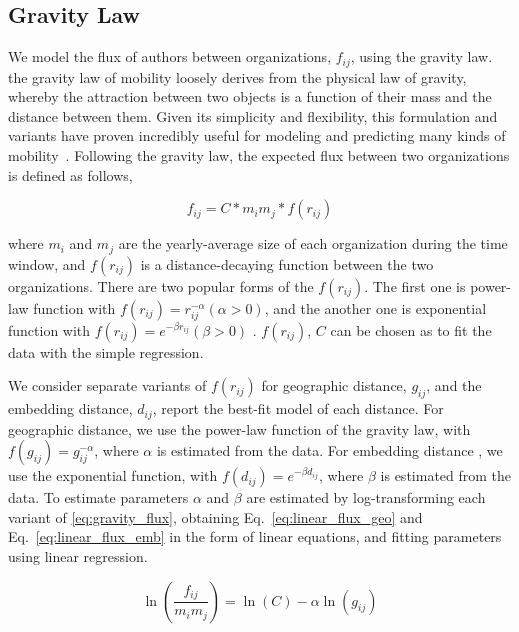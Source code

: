 \documentclass[12pt]{article} %
\begin{document}
%
%
\subsection{Gravity Law}

We model the flux of authors between organizations, $f_{ij}$, using the gravity law. 
the gravity law of mobility loosely derives from the physical law of gravity, whereby the attraction between two objects is a function of their mass and the distance between them.
Given its simplicity and flexibility, this formulation and variants have proven incredibly useful for modeling and predicting many kinds of mobility~\autocite{jung2008highwaygravity, curiel2018citygravity, lewer2008immigrationgravity, xia2005measlesgravity, truscott2012epidemicgravity, hong2016busgravity}.
Following the gravity law, the expected flux between two organizations is defined as follows,

\begin{equation}
	\label{eq:gravity_basic}
	f_{ij} = C*m_{i}m_{j}*f(r_{ij})
\end{equation}

where $m_{i}$ and $m_{j}$ are the yearly-average size of each organization during the time window, and $f(r_{ij})$ is a distance-decaying function  between the two organizations. There are two popular forms of the $f(r_{ij})$. The first one is power-law function with $f(r_{ij})= r^{-\alpha}_{ij}  (\alpha > 0)$, and the another one is exponential function with $f(r_{ij}) = e^{-\beta r_{ij}} (\beta > 0)$ \autocite{chen2015distance}.  $f(r_{ij})$, $C$ can be chosen as to fit the data with the simple regression.

We consider separate variants of $f(r_{ij})$ for geographic distance, $g_{ij}$, and the embedding distance, $d_{ij}$, report the best-fit model of each distance.
For geographic distance, we use the power-law function of the gravity law, with $f(g_{ij})= g^{-\alpha}_{ij}$, where $\alpha$ is estimated from the data. 
For embedding distance , we use the exponential function, with $f(d_{ij}) = e^{-\beta d_{ij}}$, where $\beta$ is estimated from the data. 
To estimate parameters $\alpha$ and $\beta$ are estimated by log-transforming each variant of \ref{eq:gravity_flux}, obtaining Eq.~\ref{eq:linear_flux_geo} and Eq.~\ref{eq:linear_flux_emb} in the form of linear equations, and fitting parameters using linear regression. 


\begin{equation}
	\label{eq:linear_flux_geo}
	\ln(\frac{f_{ij}}{m_im_j}) = \ln(C)  - \alpha \ln(g_{ij})
\end{equation}
\end{document}
